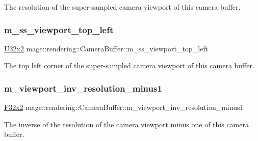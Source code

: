 The resolution of the super-\/sampled camera viewport of this camera buffer. \hypertarget{structmage_1_1rendering_1_1_camera_buffer_a9df1f7b7d6444504fcbc767171b5bfa7}{}\label{structmage_1_1rendering_1_1_camera_buffer_a9df1f7b7d6444504fcbc767171b5bfa7} 
\subsubsection{\texorpdfstring{m\+\_\+ss\+\_\+viewport\+\_\+top\+\_\+left}{m\_ss\_viewport\_top\_left}}
{\footnotesize\ttfamily \hyperlink{namespacemage_a88e05bff0300120c013285d3dcad95c5}{U32x2} mage\+::rendering\+::\+Camera\+Buffer\+::m\+\_\+ss\+\_\+viewport\+\_\+top\+\_\+left}

The top left corner of the super-\/sampled camera viewport of this camera buffer. \hypertarget{structmage_1_1rendering_1_1_camera_buffer_a87dae6d19b7c84d361ff5304cc0fd637}{}\label{structmage_1_1rendering_1_1_camera_buffer_a87dae6d19b7c84d361ff5304cc0fd637} 
\subsubsection{\texorpdfstring{m\+\_\+viewport\+\_\+inv\+\_\+resolution\+\_\+minus1}{m\_viewport\_inv\_resolution\_minus1}}
{\footnotesize\ttfamily \hyperlink{namespacemage_aa87237ad091f5cd7da612b8523fc108f}{F32x2} mage\+::rendering\+::\+Camera\+Buffer\+::m\+\_\+viewport\+\_\+inv\+\_\+resolution\+\_\+minus1}

The inverse of the resolution of the camera viewport minus one of this camera buffer. \hypertarget{structmage_1_1rendering_1_1_camera_buffer_a433bdb3d8b4e86fcd04fdb2b794bd0f7}{}\label{structmage_1_1rendering_1_1_camera_buffer_a433bdb3d8b4e86fcd04fdb2b794bd0f7} 
